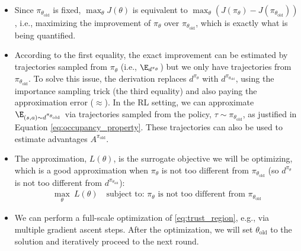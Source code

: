 \begin{itemize}
    \item Since $\pi_{\theta_{\text{old}}}$ is fixed, $\max_\theta J(\theta)$ is equivalent to $\max_\theta (J(\pi_\theta)-J(\pi_{\theta_{\text{old}}}))$, i.e., maximizing the improvement of $\pi_\theta$ over $\pi_{\theta_{\text{old}}}$, which is exactly what is being quantified.
    \item According to the first equality, the exact improvement can be estimated by trajectories sampled from $\pi_\theta$ (i.e., $\E_{d^{\pi_\theta}}$) but we only have trajectories from $\pi_{\theta_{\text{old}}}$.
    To solve this issue, the derivation replaces $d^{\pi_\theta}$ with $d^{\pi_{\theta_{\text{old}}}}$, using the importance sampling trick (the third equality) and also paying the approximation error ($\approx$).
    In the RL setting, we can approximate $\E_{(s,a)\sim d^{\pi_{\theta_{\text{old}}}}}$ via trajectories sampled from the policy, $\tau\sim\pi_{\theta_{\text{old}}}$, as justified in Equation \eqref{eq:occupancy_property}.
    These trajectories can also be used to estimate advantages $A^{\pi_{\text{old}}}$.
    \item  The approximation, $L(\theta)$, is the surrogate objective we will be optimizing, which is a good approximation when $\pi_{\theta}$ is not too different from $\pi_{\theta_{\text{old}}}$ (so $d^{\pi_{\theta}}$ is not too different from $d^{\pi_{\theta_{\text{old}}}}$):
    \begin{align}
    \label{eq:trust_region}
        \max_{\theta}~ L(\theta)\quad \text{subject to: $\pi_{\theta}$ is not too different from $\pi_{\theta_{\text{old}}}$}
    \end{align}

    \item We can perform a full-scale optimization of \eqref{eq:trust_region}, e.g., via multiple gradient ascent steps. After the optimization, we will set $\theta_{\text{old}}$ to the solution and iteratively proceed to the next round.
\end{itemize}


